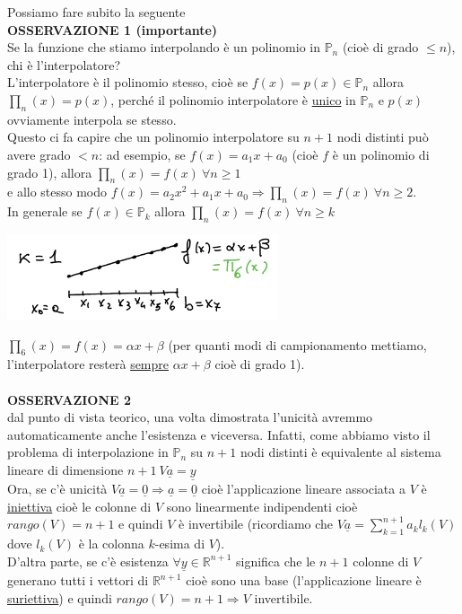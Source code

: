 \documentclass[12pt]{article}
\begin{document}
Possiamo fare subito la seguente\\
\textbf{OSSERVAZIONE 1 (importante)}\\
Se la funzione che stiamo interpolando è un polinomio in $\mathbb{P}_n$ (cioè di grado $\leq n$), chi è l'interpolatore?\\
L'interpolatore è il polinomio stesso, cioè se $f(x) = p(x) \in \mathbb{P}_n$ allora $\prod_n(x) = p(x)$, perché il polinomio interpolatore è \underline{unico} in $\mathbb{P}_n$ e
$p(x)$ ovviamente interpola se stesso.\\
Questo ci fa capire che un polinomio interpolatore su $n+1$ nodi distinti può avere grado $<n$: ad esempio, se $f(x) = a_1x + a_0$ (cioè $f$ è un polinomio di grado 1), allora $\prod_n(x) = f(x) \ \forall n \ge 1$\\
e allo stesso modo $f(x) = a_2x^2 + a_1x + a_0 \Rightarrow \prod_n(x) = f(x) \ \forall n \ge 2$.\\
In generale se $f(x) \in \mathbb{P}_k$ allora $\prod_n(x) = f(x) \ \forall n \ge k$
\begin{center}
    \includegraphics[width=0.6\textwidth]{pag24.PNG}
\end{center}
$\prod_6(x) = f(x) = \alpha x + \beta$ (per quanti modi di campionamento mettiamo, l'interpolatore resterà \underline{sempre} $\alpha x + \beta$ cioè di grado 1).\\\\
\textbf{OSSERVAZIONE 2}\\
dal punto di vista teorico, una volta dimostrata l'unicità avremmo automaticamente
anche l'esistenza e viceversa. Infatti, come abbiamo visto il problema di interpolazione in $\mathbb{P}_n$ su $n+1$ nodi distinti è equivalente al sistema lineare di dimensione $n+1 \ V\underline{a} = \underline{y}$\\
Ora, se c'è unicità $V\underline{a} = \underline{0} \Rightarrow \underline{a} = \underline{0}$ cioè l'applicazione lineare associata a $V$ è \underline{iniettiva} cioè le colonne di $V$ sono linearmente indipendenti cioè $rango(V)=n+1$ e quindi $V$ è invertibile (ricordiamo che $V \underline{a} = \sum_{k=1}^{n+1} a_k l_k(V)$ dove $l_k(V)$ è la colonna $k$-esima di $V$).\\
D'altra parte, se c'è esistenza $\forall \underline{y} \in \mathbb{R}^{n+1}$ significa che le $n+1$ colonne di $V$ generano tutti i vettori di $\mathbb{R}^{n+1}$ cioè sono una base (l'applicazione lineare è \underline{suriettiva}) e quindi $rango(V)=n+1 \Rightarrow V$ invertibile.\\
\end{document}
